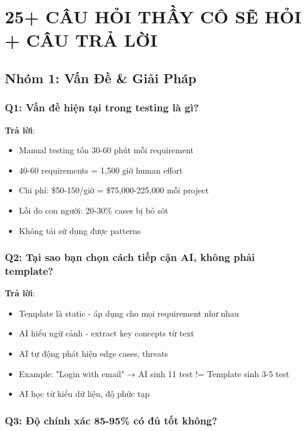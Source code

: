 \documentclass[12pt,a4paper]{report}
\begin{document}
\chapter{25+ CÂU HỎI THẦY CÔ SẼ HỎI + CÂU TRẢ LỜI}

\section{Nhóm 1: Vấn Đề & Giải Pháp}

\subsection{Q1: Vấn đề hiện tại trong testing là gì?}

\textbf{Trả lời}: 
\begin{itemize}
    \item Manual testing tốn 30-60 phút mỗi requirement
    \item 40-60 requirements = 1,500 giờ human effort
    \item Chi phí: \$50-150/giờ = \$75,000-225,000 mỗi project
    \item Lỗi do con người: 20-30\% cases bị bỏ sót
    \item Không tái sử dụng được patterns
\end{itemize}

\subsection{Q2: Tại sao bạn chọn cách tiếp cận AI, không phải template?}

\textbf{Trả lời}:
\begin{itemize}
    \item Template là static - áp dụng cho mọi requirement như nhau
    \item AI hiểu ngữ cảnh - extract key concepts từ text
    \item AI tự động phát hiện edge cases, threats
    \item Example: "Login with email" → AI sinh 11 test != Template sinh 3-5 test
    \item AI học từ kiểu dữ liệu, độ phức tạp
\end{itemize}

\subsection{Q3: Độ chính xác 85-95\% có đủ tốt không?}
\end{document}
